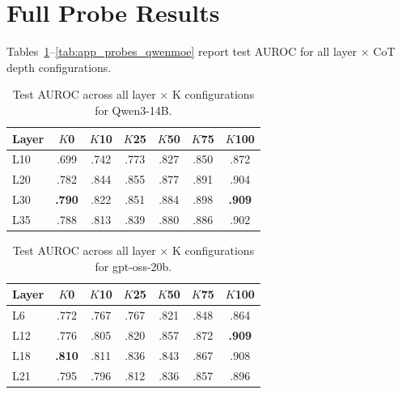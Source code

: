 \documentclass[11pt]{article}
\begin{document}


\appendix
\onecolumn

\section{Full Probe Results}
\label{app:probes}

Tables~\ref{tab:app_probes_qwen}--\ref{tab:app_probes_qwenmoe} report test AUROC for all layer $\times$ CoT depth configurations.

\begin{table}[H]
\caption{Test AUROC across all layer $\times$ K configurations for Qwen3-14B.}
\label{tab:app_probes_qwen}
\begin{center}
\begin{small}
\begin{sc}
\begin{tabular}{lcccccc}
\toprule
Layer & $K$0 & $K$10 & $K$25 & $K$50 & $K$75 & $K$100 \\
\midrule
L10 & .699 & .742 & .773 & .827 & .850 & .872 \\
L20 & .782 & .844 & .855 & .877 & .891 & .904 \\
L30 & \textbf{.790} & .822 & .851 & .884 & .898 & \textbf{.909} \\
L35 & .788 & .813 & .839 & .880 & .886 & .902 \\
\bottomrule
\end{tabular}
\end{sc}
\end{small}
\end{center}
\end{table}

\begin{table}[H]
\caption{Test AUROC across all layer $\times$ K configurations for gpt-oss-20b.}
\label{tab:app_probes_gptoss}
\begin{center}
\begin{small}
\begin{sc}
\begin{tabular}{lcccccc}
\toprule
Layer & $K$0 & $K$10 & $K$25 & $K$50 & $K$75 & $K$100 \\
\midrule
L6  & .772 & .767 & .767 & .821 & .848 & .864 \\
L12 & .776 & .805 & .820 & .857 & .872 & \textbf{.909} \\
L18 & \textbf{.810} & .811 & .836 & .843 & .867 & .908 \\
L21 & .795 & .796 & .812 & .836 & .857 & .896 \\
\bottomrule
\end{tabular}
\end{sc}
\end{small}
\end{center}
\end{table}
\end{document}

